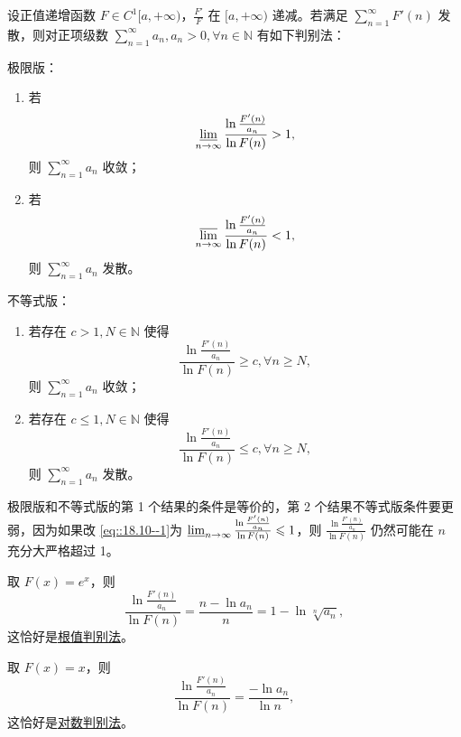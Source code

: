 \documentclass[../../main.tex]{subfiles}
\begin{document}
\begin{theorem}[Cauchy链]\label{theorem:Cauchy链}
设正值递增函数 \( F \in C^1[a, +\infty) \)，\(\frac{F'}{F}\) 在 \([a, +\infty)\) 递减。若满足 \(\sum_{n=1}^\infty F'(n)\) 发散，则对正项级数 \(\sum_{n=1}^\infty a_n, a_n > 0, \forall n \in \mathbb{N}\) 有如下判别法：

极限版：
\begin{enumerate}
\item 若
\begin{align}
\varliminf_{n \to \infty} \frac{\ln \frac{F'(n)}{a_n}}{\ln F(n)} > 1, \label{eq::18.9--1}
\end{align}
则 \(\sum_{n=1}^\infty a_n\) 收敛；

\item 若
\begin{align}
\varlimsup_{n \to \infty} \frac{\ln \frac{F'(n)}{a_n}}{\ln F(n)} < 1, \label{eq::18.10--1}
\end{align}
则 \(\sum_{n=1}^\infty a_n\) 发散。
\end{enumerate}

不等式版：
\begin{enumerate}
\item 若存在 \( c > 1, N \in \mathbb{N} \) 使得
\[
\frac{\ln \frac{F'(n)}{a_n}}{\ln F(n)} \geqslant c, \forall n \geqslant N,
\]
则 \(\sum_{n=1}^\infty a_n\) 收敛；

\item 若存在 \( c \leqslant 1, N \in \mathbb{N} \) 使得
\[
\frac{\ln \frac{F'(n)}{a_n}}{\ln F(n)} \leqslant c, \forall n \geqslant N,
\]
则 \(\sum_{n=1}^\infty a_n\) 发散。
\end{enumerate}
\end{theorem}
\begin{note}
极限版和不等式版的第 1 个结果的条件是等价的，第 2 个结果不等式版条件要更弱，因为如果改 \eqref{eq::18.10--1}为 \(\varliminf_{n \to \infty} \frac{\ln \frac{F'(n)}{a_n}}{\ln F(n)} \leqslant 1\)，则 \(\frac{\ln \frac{F'(n)}{a_n}}{\ln F(n)}\) 仍然可能在 \( n \) 充分大严格超过 1。
\end{note}
\begin{remark}
取 \( F(x) = e^x \)，则
\[
\frac{\ln \frac{F'(n)}{a_n}}{\ln F(n)} = \frac{n - \ln a_n}{n} = 1 - \ln \sqrt[n]{a_n},
\]
这恰好是\hyperref[theorem:级数-根值判别法]{根值判别法}。

取 \( F(x) = x \)，则
\[
\frac{\ln \frac{F'(n)}{a_n}}{\ln F(n)} = \frac{-\ln a_n}{\ln n},
\]
这恰好是\hyperref[theorem:级数-对数判别法]{对数判别法}。
\end{remark}
\end{document}
